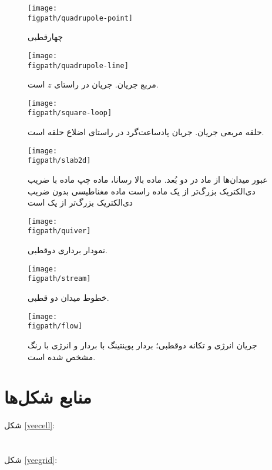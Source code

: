 \documentclass[12pt,a4paper]{article}
\newcommand{\figpath}{../figures}
\newcommand{\figwidth}{0.9\linewidth}
\begin{document}
	\begin{figure}
		\centering
		\texttt{[image: \\figpath/quadrupole-point]}
		\caption{چهارقطبی}
		\texttt{[image: \\figpath/quadrupole-line]}
		\caption{مربع جریان. جریان در راستای $z$ است.}
	\end{figure}
	\begin{figure}
		\centering
		\texttt{[image: \\figpath/square-loop]}
		\caption{حلقه مربعی جریان. جریان پادساعت‌گرد در راستای اضلاع حلقه است.}
		\texttt{[image: \\figpath/slab2d]}
		\caption{عبور میدان‌ها از ماد در دو بُعد. ماده بالا رسانا، ماده چپ ماده با ضریب دی‌الکتریک بزرگ‌تر از یک 
			ماده راست ماده مغناطیسی بدون ضریب دی‌الکتریک بزرگ‌تر از یک است}
	\end{figure}
	\begin{figure}
		\centering
		\texttt{[image: \\figpath/quiver]}
		\caption{نمودار برداری دوقطبی.}
		\texttt{[image: \\figpath/stream]}
		\caption{خطوط میدان دو قطبی.}
	\end{figure}
	\begin{figure}
		\centering
		\texttt{[image: \\figpath/flow]}
		\caption{جریان انرژی و تکانه دوقطبی؛ بردار پوینتینگ با بردار و انرژی با رنگ مشخص شده است.}
	\end{figure}
	\FloatBarrier
	\setLTRbibitems
	
	
	\section*{منابع شکل‌ها}
	شکل \ref{yeecell}: \\
	 \\ \\
	شکل \ref{yeegrid}: \\
\end{document}

